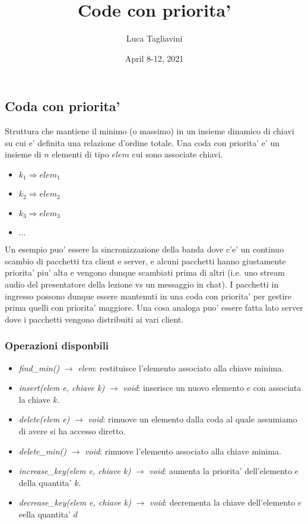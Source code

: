 \documentclass{article}
\title{\textbf{Code con priorita'}}
\author{Luca Tagliavini}
\date{April 8-12, 2021}
\begin{document}
\maketitle
\tableofcontents
\pagebreak

\subsection{Coda con priorita'}

Struttura che mantiene il minimo (o massimo) in un insieme dinamico di chiavi
su cui e' definita una relazione d'ordine totale. Una coda con priorita' e' un 
insieme di $n$ elementi di tipo $elem$ cui sono associate chiavi.
\begin{itemize}
  \item $k_1 \Rightarrow elem_1$
  \item $k_2 \Rightarrow elem_2$
  \item $k_3 \Rightarrow elem_3$
  \item $\ldots$
\end{itemize}

Un esempio puo' essere la sincronizzazione della banda dove c'e' un continuo
scambio di pacchetti tra client e server, e alcuni pacchetti hanno giustamente
priorita' piu' alta e vengono dunque scambiati prima di altri (i.e. uno stream
audio del presentatore della lezione vs un messaggio in chat).
I pacchetti in ingresso possono dunque essere mantenuti in una coda con priorita'
per gestire prima quelli con priorita' maggiore. Una cosa analoga puo' essere fatta
lato server dove i pacchetti vengono distribuiti ai vari client.

\subsubsection{Operazioni disponbili}

\begin{itemize}
  \item \emph{find\_min()} $\rightarrow$ \emph{elem}: restituisce l'elemento associato
    alla chiave minima.
  \item \emph{insert(elem e, chiave k)} $\rightarrow$ \emph{void}: inserisce un nuovo
    elemento $e$ con associata la chiave $k$.
  \item \emph{delete(elem e)} $\rightarrow$ \emph{void}: rimuove un elemento dalla coda
    al quale assumiamo di avere si ha accesso diretto.
  \item \emph{delete\_min()} $\rightarrow$ \emph{void}: rimuove l'elemento associato alla
    chiave minima.
  \item \emph{increase\_key(elem e, chiave k)} $\rightarrow$ \emph{void}: aumenta la
    priorita' dell'elemento $e$ della quantita' $k$.
  \item \emph{decrease\_key(elem e, chiave k)} $\rightarrow$ \emph{void}: decrementa la
    chiave dell'elemento $e$ eella quantita' $d$
\end{itemize}
\end{document}

